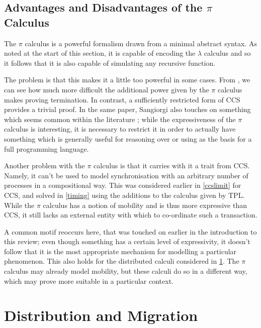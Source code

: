 \subsection{Advantages and Disadvantages of the $\pi$ Calculus}
\label{pilimit}

The $\pi$ calculus is a powerful formalism drawn from a minimal
abstract syntax.  As noted at the start of this section, it is capable
of encoding the $\lambda$ calculus and so it follows that it is also
capable of simulating any recursive function.

The problem is that this makes it a little too powerful in some cases.
From \cite{sangiorgi:types-or}, we can see how much more difficult the
additional power given by the $\pi$ calculus makes proving
termination.  In contrast, a sufficiently restricted form of CCS
provides a trivial proof.  In the same paper, Sangiorgi also touches
on something which seems common within the literature
\cite{join,failure2,wojciechowski:phd,stefani:kells}; while the
expressiveness of the $\pi$ calculus is interesting, it is necessary
to restrict it in order to actually have something which is generally
useful for reasoning over or using as the basis for a full programming
language.

Another problem with the $\pi$ calculus is that it carries with it a
trait from CCS.  Namely, it can't be used to model synchronisation
with an arbitrary number of processes in a compositional way.  This
was considered earlier in \ref{ccslimit} for CCS, and solved in
\ref{timing} using the additions to the calculus given by TPL.  While
the $\pi$ calculus has a notion of mobility and is thus more
expressive than CCS, it still lacks an external entity with which to
co-ordinate such a transaction.  

A common motif reoccurs here, that was touched on earlier in the
introduction to this review; even though something has a certain level
of expressivity, it doesn't follow that it is the most appropriate
mechanism for modelling a particular phenomenon.  This also holds for
the distributed calculi considered in \ref{migration}.  The $\pi$
calculus may already model mobility, but these calculi do so in a
different way, which may prove more suitable in a particular context.
 
\section{Distribution and Migration}
\label{migration}

